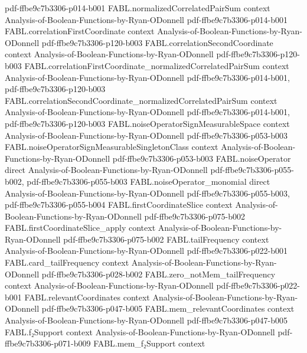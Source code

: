\begin{theorem}
  {pdf-ffbe9c7b3306-p014-b001}
\proofstep
  {FABL.normalizedCorrelatedPairSum}
  {context}
  {Analysis-of-Boolean-Functions-by-Ryan-ODonnell}
  {pdf-ffbe9c7b3306-p014-b001}
\proofstep
  {FABL.correlationFirstCoordinate}
  {context}
  {Analysis-of-Boolean-Functions-by-Ryan-ODonnell}
  {pdf-ffbe9c7b3306-p120-b003}
\proofstep
  {FABL.correlationSecondCoordinate}
  {context}
  {Analysis-of-Boolean-Functions-by-Ryan-ODonnell}
  {pdf-ffbe9c7b3306-p120-b003}
\proofstep
  {FABL.correlationFirstCoordinate_normalizedCorrelatedPairSum}
  {context}
  {Analysis-of-Boolean-Functions-by-Ryan-ODonnell}
  {pdf-ffbe9c7b3306-p014-b001,
    pdf-ffbe9c7b3306-p120-b003}
\proofstep
  {FABL.correlationSecondCoordinate_normalizedCorrelatedPairSum}
  {context}
  {Analysis-of-Boolean-Functions-by-Ryan-ODonnell}
  {pdf-ffbe9c7b3306-p014-b001,
    pdf-ffbe9c7b3306-p120-b003}
\proofstep
  {FABL.noiseOperatorSignMeasurableSpace}
  {context}
  {Analysis-of-Boolean-Functions-by-Ryan-ODonnell}
  {pdf-ffbe9c7b3306-p053-b003}
\proofstep
  {FABL.noiseOperatorSignMeasurableSingletonClass}
  {context}
  {Analysis-of-Boolean-Functions-by-Ryan-ODonnell}
  {pdf-ffbe9c7b3306-p053-b003}
\proofstep
  {FABL.noiseOperator}
  {direct}
  {Analysis-of-Boolean-Functions-by-Ryan-ODonnell}
  {pdf-ffbe9c7b3306-p055-b002,
    pdf-ffbe9c7b3306-p055-b003}
\proofstep
  {FABL.noiseOperator_monomial}
  {direct}
  {Analysis-of-Boolean-Functions-by-Ryan-ODonnell}
  {pdf-ffbe9c7b3306-p055-b003,
    pdf-ffbe9c7b3306-p055-b004}
\proofstep
  {FABL.firstCoordinateSlice}
  {context}
  {Analysis-of-Boolean-Functions-by-Ryan-ODonnell}
  {pdf-ffbe9c7b3306-p075-b002}
\proofstep
  {FABL.firstCoordinateSlice_apply}
  {context}
  {Analysis-of-Boolean-Functions-by-Ryan-ODonnell}
  {pdf-ffbe9c7b3306-p075-b002}
\proofstep
  {FABL.tailFrequency}
  {context}
  {Analysis-of-Boolean-Functions-by-Ryan-ODonnell}
  {pdf-ffbe9c7b3306-p022-b001}
\proofstep
  {FABL.card_tailFrequency}
  {context}
  {Analysis-of-Boolean-Functions-by-Ryan-ODonnell}
  {pdf-ffbe9c7b3306-p028-b002}
\proofstep
  {FABL.zero_notMem_tailFrequency}
  {context}
  {Analysis-of-Boolean-Functions-by-Ryan-ODonnell}
  {pdf-ffbe9c7b3306-p022-b001}
\proofstep
  {FABL.relevantCoordinates}
  {context}
  {Analysis-of-Boolean-Functions-by-Ryan-ODonnell}
  {pdf-ffbe9c7b3306-p047-b005}
\proofstep
  {FABL.mem_relevantCoordinates}
  {context}
  {Analysis-of-Boolean-Functions-by-Ryan-ODonnell}
  {pdf-ffbe9c7b3306-p047-b005}
\proofstep
  {FABL.f₂Support}
  {context}
  {Analysis-of-Boolean-Functions-by-Ryan-ODonnell}
  {pdf-ffbe9c7b3306-p071-b009}
\proofstep
  {FABL.mem_f₂Support}
  {context}

\end{theorem}
